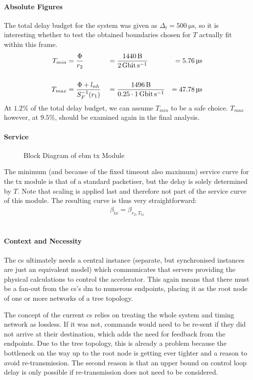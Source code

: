 \paragraph{Absolute Figures}
The total delay budget for the system was given as $\Delta_t = \SI{500}{\micro\second}$, so it is interesting whether to test the obtained boundaries chosen for $T$ actually fit within this frame.
\begin{align}
T_{min} &=\frac{\Phi}{r_2} &&= \frac{\SI{1440}{\byte}}{ \SI{2}{\giga\bit\per\second}} &= \SI{5.76}{\micro\second}\\
\notag\\
T_{max} &= \frac{\Phi + l_{nh}}{S^{-1}_F(r_1)} &&= \frac{\SI{1496}{\byte}}{0.25 \cdot \SI{1}{\giga\bit\per\second}} &= \SI{47.78}{\micro\second}
\end{align}
At $1.2\%$ of the total delay budget, we can assume $T_{min}$ to be a safe choice. $T_{max}$ however, at $9.5\%$, should be
examined again in the final analysis.
\paragraph{Service}

\begin{figure}[H]
  \centering
  \def\svgwidth{0.6875\textwidth}
  
  \caption{Block Diagram of \gls{ebm} \gls{tx} Module}
  \label{fig:tx}
\end{figure}
\noindent
The minimum (and because of the fixed timeout also maximum) service curve for the \gls{tx} module is that of a standard packetiser, but the delay is solely determined by $T$. 
Note that scaling is applied last and therefore not part of the service curve of this module.
The resulting curve is thus very straightforward:
%
\begin{align}
\beta_{tx} = \beta_{r_2, T_{tx}}
\end{align}
%
\section{}
\label{sec:fec}
\paragraph{Context and Necessity}
The  \gls{cs} ultimately needs a central instance (separate, but synchronised instances are just an equivalent model) which communicates that servers providing the physical calculations to control the accelerator.
This again means that there must be a fan-out from the  \gls{cs}'s \gls{dm} to numerous endpoints, placing it as the root node of one or more networks of a tree topology.
\par
The concept of the current  \gls{cs} relies on treating the whole system and timing network as lossless.
If it was not, commands would need to be re-sent if they did not arrive at their destination, which adds the need for feedback from the endpoints. 
Due to the tree topology, this is already a problem because the bottleneck on the way up to the root node is getting ever tighter and a reason to avoid re-transmission.
The second reason is that an upper bound on control loop delay is only possible if re-transmission does not need to be considered.
